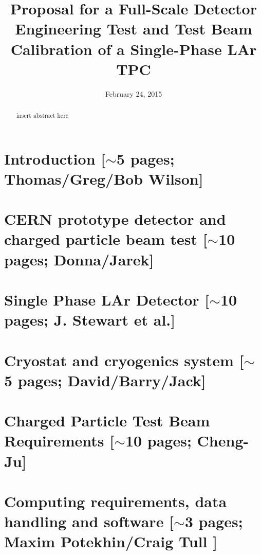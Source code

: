 \documentclass[12pt]{article}
\begin{document}
\linenumbers

\title{  Proposal for a Full-Scale Detector Engineering Test and Test Beam Calibration of a Single-Phase LAr TPC}

\date{February 24, 2015}
	

\maketitle



\begin{abstract}

insert abstract here

\end{abstract}

\newpage
\tableofcontents

\newpage

\section{Introduction [$\sim$5 pages; {\color{red} Thomas/Greg/Bob Wilson}]}
	
%	

\section{CERN prototype detector and charged particle beam test [$\sim$10 pages; {\color{red} Donna/Jarek}]}
	
	

\section{Single Phase LAr Detector [$\sim$10 pages; {\color{red} J. Stewart et al.}]}
\rm

	


\section{Cryostat and cryogenics system [$\sim$5 pages; {\color{red} David/Barry/Jack}]}
	

\newpage
\section{Charged Particle Test Beam Requirements [$\sim$10 pages; {\color{red} Cheng-Ju}]}
	


\section{Computing requirements, data handling and software  [$\sim$3 pages; {\color{red} Maxim Potekhin/Craig Tull }]}
	
\end{document}
